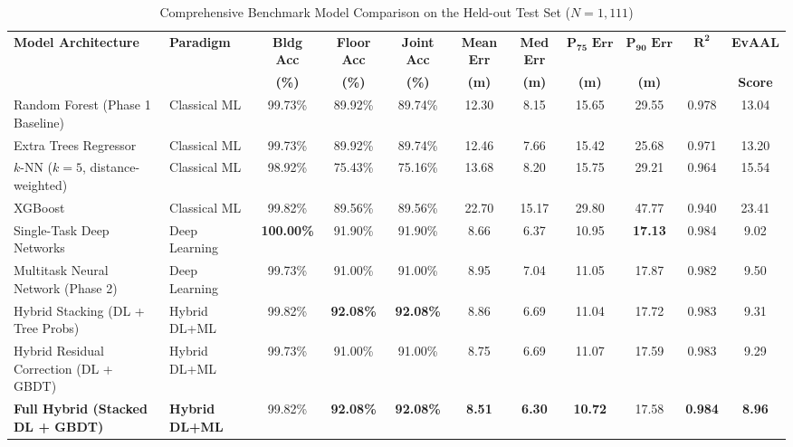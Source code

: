 \begin{table}[t]
\centering
\caption{Comprehensive Benchmark Model Comparison on the Held-out Test Set ($N = 1{,}111$)}
\label{tab:final_comparison}
\renewcommand{\arraystretch}{1.2}
\setlength{\tabcolsep}{5pt}
\begin{tabular}{@{}llccccccccc@{}}
\toprule
\textbf{Model Architecture} & \textbf{Paradigm} & \textbf{Bldg Acc} & \textbf{Floor Acc} & \textbf{Joint Acc} & \textbf{Mean Err} & \textbf{Med Err} & $\mathbf{P_{75}\text{ Err}}$ & $\mathbf{P_{90}\text{ Err}}$ & $\mathbf{R^2}$ & \textbf{EvAAL} \\
 & & \textbf{(\%)} & \textbf{(\%)} & \textbf{(\%)} & \textbf{(m)} & \textbf{(m)} & \textbf{(m)} & \textbf{(m)} & & \textbf{Score} \\
\midrule
Random Forest (Phase 1 Baseline)      & Classical ML & 99.73\% & 89.92\% & 89.74\% & 12.30 & 8.15 & 15.65 & 29.55 & 0.978 & 13.04 \\
Extra Trees Regressor                 & Classical ML & 99.73\% & 89.92\% & 89.74\% & 12.46 & 7.66 & 15.42 & 25.68 & 0.971 & 13.20 \\
$k$-NN ($k=5$, distance-weighted)     & Classical ML & 98.92\% & 75.43\% & 75.16\% & 13.68 & 8.20 & 15.75 & 29.21 & 0.964 & 15.54 \\
XGBoost                               & Classical ML & 99.82\% & 89.56\% & 89.56\% & 22.70 & 15.17 & 29.80 & 47.77 & 0.940 & 23.41 \\
\midrule
Single-Task Deep Networks             & Deep Learning & \textbf{100.00\%} & 91.90\% & 91.90\% & 8.66 & 6.37 & 10.95 & \textbf{17.13} & 0.984 & 9.02 \\
Multitask Neural Network (Phase 2)    & Deep Learning & 99.73\% & 91.00\% & 91.00\% & 8.95 & 7.04 & 11.05 & 17.87 & 0.982 & 9.50 \\
Hybrid Stacking (DL + Tree Probs)     & Hybrid DL+ML & 99.82\% & \textbf{92.08\%} & \textbf{92.08\%} & 8.86 & 6.69 & 11.04 & 17.72 & 0.983 & 9.31 \\
Hybrid Residual Correction (DL + GBDT)& Hybrid DL+ML & 99.73\% & 91.00\% & 91.00\% & 8.75 & 6.69 & 11.07 & 17.59 & 0.983 & 9.29 \\
\textbf{Full Hybrid (Stacked DL + GBDT)} & \textbf{Hybrid DL+ML} & 99.82\% & \textbf{92.08\%} & \textbf{92.08\%} & \textbf{8.51} & \textbf{6.30} & \textbf{10.72} & 17.58 & \textbf{0.984} & \textbf{8.96} \\
\bottomrule
\end{tabular}
\end{table}


